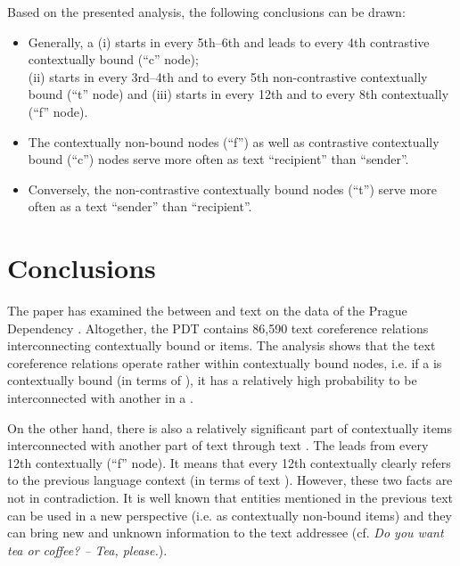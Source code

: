 \documentclass[output=paper]{langsci/langscibook.cls}
\begin{document}
Based on the presented analysis, the following conclusions can be drawn:



\begin{itemize}
\item 

Generally, a  (i) starts in every 5th--6th and leads to every 4th contrastive contextually bound  (``c'' node); \\(ii) starts in every 3rd--4th and to every 5th non-contrastive contextually bound  (``t'' node) and (iii) starts in every 12th and to every 8th contextually  (``f'' node).


\newpage 
\item 

The contextually non-bound nodes (``f'') as well as contrastive contextually bound (``c'') nodes serve more often as text  ``recipient'' than ``sender''. 


\item 

Conversely, the non-contrastive contextually bound nodes (``t'') serve more often as a text  ``sender'' than ``recipient''.


\end{itemize}

\section{Conclusions\label{rysova_k:sec:Conclusions}}

The paper has examined the  between  and text  on the data of the Prague Dependency . Altogether, the PDT contains 86,590 text coreference relations interconnecting contextually bound or  items. The analysis shows that the text coreference relations operate rather within contextually bound nodes, i.e. if a  is contextually bound (in terms of ), it has a relatively high probability to be interconnected with another  in a .




On the other hand, there is also a relatively significant part of contextually  items interconnected with another part of text through text . The  leads from every 12th contextually  (``f'' node). It means that every 12th contextually  clearly refers to the previous language context (in terms of text ). However, these two facts are not in contradiction. It is well known that entities mentioned in the previous text can be used in a new perspective (i.e. as contextually non-bound items) and they can bring new and unknown information to the text addressee (cf. \textit{Do you want tea or coffee? -- Tea, please.}).
\end{document}
